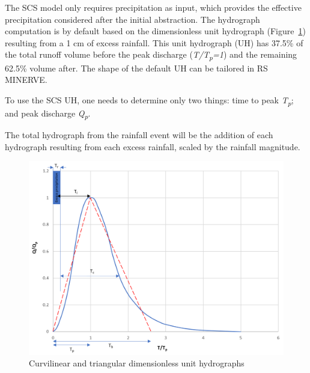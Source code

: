 \documentclass[
  letterpaper,
  DIV=11,
  numbers=noendperiod]{scrreprt}
\begin{document}
The SCS model only requires precipitation as input, which provides the
effective precipitation considered after the initial abstraction. The
hydrograph computation is by default based on the dimensionless unit
hydrograph (Figure~\ref{fig-model_scs}) resulting from a 1 cm of excess
rainfall. This unit hydrograph (UH) has 37.5\% of the total runoff
volume before the peak discharge (\emph{T/T\textsubscript{p}=1}) and the
remaining 62.5\% volume after. The shape of the default UH can be
tailored in RS MINERVE.

To use the SCS UH, one needs to determine only two things: time to peak
\emph{T\textsubscript{p}}; and peak discharge \emph{Q\textsubscript{p}}.

The total hydrograph from the rainfall event will be the addition of
each hydrograph resulting from each excess rainfall, scaled by the
rainfall magnitude.

\begin{figure}

{\centering \includegraphics{./figures/fig-model_scs.png}

}

\caption{\label{fig-model_scs}Curvilinear and triangular dimensionless
unit hydrographs}

\end{figure}
\end{document}
